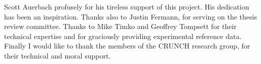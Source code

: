 
 Scott Auerbach profusely for his tireless support of this project. His dedication has been an inspiration. Thanks also to Justin Fermann, for serving on the thesis review committee. Thanks to Mike Timko and Geoffrey Tompsett for their technical expertise and for graciously providing experimental reference data. Finally I would like to thank the members of the CRUNCH research group, for their technical and moral support.